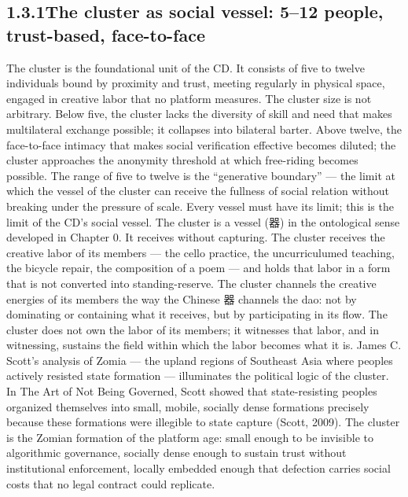 \subsection{1.3.1\quad The cluster as social vessel: 5–12 people, trust-based, face-to-face}

The cluster is the foundational unit of the CD. It consists of five to twelve individuals bound by proximity and trust, meeting regularly in physical space, engaged in creative labor that no platform measures. The cluster size is not arbitrary. Below five, the cluster lacks the diversity of skill and need that makes multilateral exchange possible; it collapses into bilateral barter. Above twelve, the face-to-face intimacy that makes social verification effective becomes diluted; the cluster approaches the anonymity threshold at which free-riding becomes possible. The range of five to twelve is the “generative boundary” — the limit at which the vessel of the cluster can receive the fullness of social relation without breaking under the pressure of scale. Every vessel must have its limit; this is the limit of the CD’s social vessel. The cluster is a vessel (器) in the ontological sense developed in Chapter 0. It receives without capturing. The cluster receives the creative labor of its members — the cello practice, the uncurriculumed teaching, the bicycle repair, the composition of a poem — and holds that labor in a form that is not converted into standing-reserve. The cluster channels the creative energies of its members the way the Chinese 器 channels the dao: not by dominating or containing what it receives, but by participating in its flow. The cluster does not own the labor of its members; it witnesses that labor, and in witnessing, sustains the field within which the labor becomes what it is. James C. Scott’s analysis of Zomia — the upland regions of Southeast Asia where peoples actively resisted state formation — illuminates the political logic of the cluster. In The Art of Not Being Governed, Scott showed that state-resisting peoples organized themselves into small, mobile, socially dense formations precisely because these formations were illegible to state capture (Scott, 2009). The cluster is the Zomian formation of the platform age: small enough to be invisible to algorithmic governance, socially dense enough to sustain trust without institutional enforcement, locally embedded enough that defection carries social costs that no legal contract could replicate.

